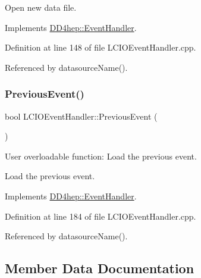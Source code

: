 Open new data file. 



Implements \hyperlink{class_d_d4hep_1_1_event_handler_a90995d3b610beee9d9f7fafcc060626b}{D\+D4hep\+::\+Event\+Handler}.



Definition at line 148 of file L\+C\+I\+O\+Event\+Handler.\+cpp.



Referenced by datasource\+Name().

\hypertarget{class_d_d4hep_1_1_l_c_i_o_event_handler_a178458d67dd58d3f5d701795fcadcd2e}{}\label{class_d_d4hep_1_1_l_c_i_o_event_handler_a178458d67dd58d3f5d701795fcadcd2e} 
\subsubsection{\texorpdfstring{Previous\+Event()}{PreviousEvent()}}
{\footnotesize\ttfamily bool L\+C\+I\+O\+Event\+Handler\+::\+Previous\+Event (\begin{DoxyParamCaption}{ }\end{DoxyParamCaption})\hspace{0.3cm}{\ttfamily [virtual]}}



User overloadable function\+: Load the previous event. 

Load the previous event. 

Implements \hyperlink{class_d_d4hep_1_1_event_handler_a0942608bebbdd107c9dedbdc7311791f}{D\+D4hep\+::\+Event\+Handler}.



Definition at line 184 of file L\+C\+I\+O\+Event\+Handler.\+cpp.



Referenced by datasource\+Name().



\subsection{Member Data Documentation}
\hypertarget{class_d_d4hep_1_1_l_c_i_o_event_handler_affa8da5c2619446e0e5c5cf9d4ad3d69}{}\label{class_d_d4hep_1_1_l_c_i_o_event_handler_affa8da5c2619446e0e5c5cf9d4ad3d69} 

